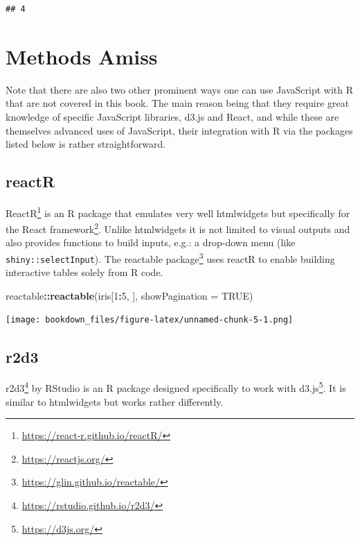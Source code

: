 \documentclass[
]{krantz}
\makeatletter
\newenvironment{Shaded}{\begin{snugshade}}{\end{snugshade}}
\newcommand{\DataTypeTok}[1]{\textcolor[rgb]{0.27,0.27,0.27}{#1}}
\newcommand{\DecValTok}[1]{\textcolor[rgb]{0.06,0.06,0.06}{#1}}
\newcommand{\KeywordTok}[1]{\textcolor[rgb]{0.27,0.27,0.27}{\textbf{#1}}}
\newcommand{\NormalTok}[1]{#1}
\newcommand{\OperatorTok}[1]{\textcolor[rgb]{0.43,0.43,0.43}{\textbf{#1}}}
\newcommand{\OtherTok}[1]{\textcolor[rgb]{0.37,0.37,0.37}{#1}}
\renewcommand{\href}[2]{#2\footnote{\url{#1}}}
\newenvironment{kframe}{%
\medskip{}
\setlength{\fboxsep}{.8em}
 \def\at@end@of@kframe{}%
 \ifinner\ifhmode%
  \def\at@end@of@kframe{\end{minipage}}%
  \begin{minipage}{\columnwidth}%
 \fi\fi%
 \def\FrameCommand##1{\hskip\@totalleftmargin \hskip-\fboxsep
 \colorbox{shadecolor}{##1}\hskip-\fboxsep
     \hskip-\linewidth \hskip-\@totalleftmargin \hskip\columnwidth}%
 \MakeFramed {\advance\hsize-\width
   \@totalleftmargin\z@ \linewidth\hsize
   \@setminipage}}%
 {\par\unskip\endMakeFramed%
 \at@end@of@kframe}
\renewenvironment{Shaded}{\begin{kframe}}{\end{kframe}}
\makeatother
\begin{document}
\begin{verbatim}
## 4
\end{verbatim}

\hypertarget{intro-amiss}{%
\section{Methods Amiss}\label{intro-amiss}}

Note that there are also two other prominent ways one can use JavaScript with R that are not covered in this book. The main reason being that they require great knowledge of specific JavaScript libraries, d3.js and React, and while these are themselves advanced uses of JavaScript, their integration with R via the packages listed below is rather straightforward.

\hypertarget{intro-reactr}{%
\subsection{reactR}\label{intro-reactr}}

\href{https://react-r.github.io/reactR/}{ReactR} \citep{R-reactR} is an R package that emulates very well htmlwidgets but specifically for the \href{https://reactjs.org/}{React framework}. Unlike htmlwidgets it is not limited to visual outputs and also provides functions to build inputs, e.g.: a drop-down menu (like \texttt{shiny::selectInput}). The \href{https://glin.github.io/reactable/}{reactable package} \citep{R-reactable} uses reactR to enable building interactive tables solely from R code.

\begin{Shaded}
\begin{Highlighting}[]
\NormalTok{reactable}\OperatorTok{::}\KeywordTok{reactable}\NormalTok{(iris[}\DecValTok{1}\OperatorTok{:}\DecValTok{5}\NormalTok{, ], }\DataTypeTok{showPagination =} \OtherTok{TRUE}\NormalTok{)}
\end{Highlighting}
\end{Shaded}

\texttt{[image: bookdown\_files/figure-latex/unnamed-chunk-5-1.png]}

\hypertarget{intro-r2d3}{%
\subsection{r2d3}\label{intro-r2d3}}

\href{https://rstudio.github.io/r2d3/}{r2d3} \citep{R-r2d3} by RStudio is an R package designed specifically to work with \href{https://d3js.org/}{d3.js}. It is similar to htmlwidgets but works rather differently.
\end{document}
